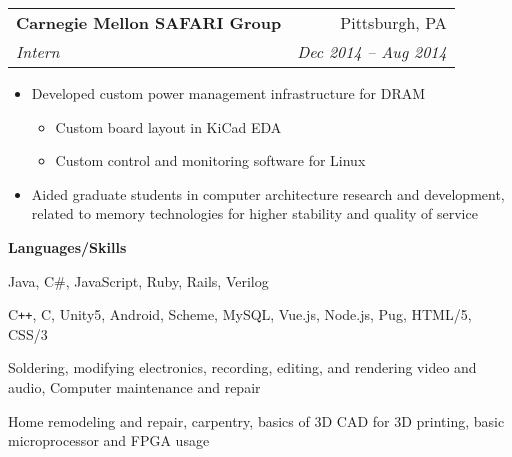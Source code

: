 \documentclass[letterpaper,11pt]{article}
\makeatletter
\newcommand{\resitem}[1]{\item #1}
\newcommand{\resheading}[1]{{\large \colorbox{shadingcolor}{\begin{minipage}{\textwidth}{\textbf{#1 \vphantom{p\^{E}}}}\end{minipage}}}}
\newcommand{\ressubheading}[4]{
\begin{tabular*}{\textwidth}{l@{\extracolsep{\fill}}r}
		\textbf{#1} & #2 \\
		\textit{#3} & \textit{#4} \\
\end{tabular*}\vspace{-6pt}}
\makeatother
\begin{document}
\begin{minipage}{\linewidth}
\begin{minipage}[t]{0.6\linewidth}
	\ressubheading{Carnegie Mellon SAFARI Group}{Pittsburgh, PA}{Intern}{Dec 2014 -- Aug 2014}
	\begin{itemize}[leftmargin=*,noitemsep]
		\resitem{Developed custom power management infrastructure for DRAM}
		\begin{itemize}[leftmargin=*,noitemsep,topsep=0pt]
			\resitem{Custom board layout in KiCad EDA}
			\resitem{Custom control and monitoring software for Linux}
		\end{itemize}
		\resitem{Aided graduate students in computer architecture research and development, related to memory technologies for higher stability and quality of service}
	\end{itemize}
\end{minipage}
\hfill
\begin{minipage}[t]{0.35\linewidth}
	\begin{minipage}[t]{\linewidth}
		\resheading{Languages/Skills}
		
		\begin{description}[noitemsep]
			\item[Strong:]
			Java, C\#, JavaScript, Ruby,  Rails, Verilog
			\item[Weak:]
			C{}\verb!++!, C, Unity5, Android, Scheme, MySQL, Vue.js, Node.js, Pug, HTML/5, CSS/3
			
			\vspace{0.1in}
			\item[Skills:]
			Soldering, modifying electronics, 
			recording, editing, and rendering video and audio, 
			Computer maintenance and repair
			\item[Misc Skills:]
			Home remodeling and repair, carpentry,
			basics of 3D CAD for 3D printing,
			basic microprocessor and FPGA usage
		\end{description}
	\end{minipage}
\end{minipage}
\end{minipage}

\vspace{0.1in}
\end{document}
